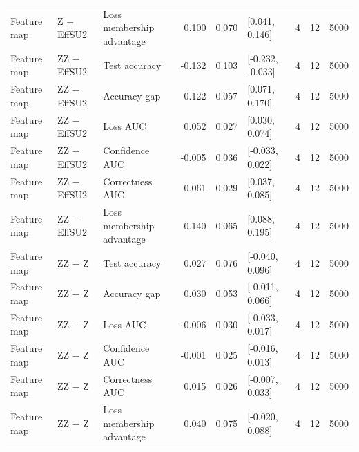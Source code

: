 \begin{table}[t]
\begin{tabular}{lllrrlrrr}
Feature map & Z − EffSU2 & Loss membership advantage & 0.100 & 0.070 & [0.041, 0.146] & 4 & 12 & 5000 \\
Feature map & ZZ − EffSU2 & Test accuracy & -0.132 & 0.103 & [-0.232, -0.033] & 4 & 12 & 5000 \\
Feature map & ZZ − EffSU2 & Accuracy gap & 0.122 & 0.057 & [0.071, 0.170] & 4 & 12 & 5000 \\
Feature map & ZZ − EffSU2 & Loss AUC & 0.052 & 0.027 & [0.030, 0.074] & 4 & 12 & 5000 \\
Feature map & ZZ − EffSU2 & Confidence AUC & -0.005 & 0.036 & [-0.033, 0.022] & 4 & 12 & 5000 \\
Feature map & ZZ − EffSU2 & Correctness AUC & 0.061 & 0.029 & [0.037, 0.085] & 4 & 12 & 5000 \\
Feature map & ZZ − EffSU2 & Loss membership advantage & 0.140 & 0.065 & [0.088, 0.195] & 4 & 12 & 5000 \\
Feature map & ZZ − Z & Test accuracy & 0.027 & 0.076 & [-0.040, 0.096] & 4 & 12 & 5000 \\
Feature map & ZZ − Z & Accuracy gap & 0.030 & 0.053 & [-0.011, 0.066] & 4 & 12 & 5000 \\
Feature map & ZZ − Z & Loss AUC & -0.006 & 0.030 & [-0.033, 0.017] & 4 & 12 & 5000 \\
Feature map & ZZ − Z & Confidence AUC & -0.001 & 0.025 & [-0.016, 0.013] & 4 & 12 & 5000 \\
Feature map & ZZ − Z & Correctness AUC & 0.015 & 0.026 & [-0.007, 0.033] & 4 & 12 & 5000 \\
Feature map & ZZ − Z & Loss membership advantage & 0.040 & 0.075 & [-0.020, 0.088] & 4 & 12 & 5000 \\
\bottomrule
\end{tabular}
\end{table}

